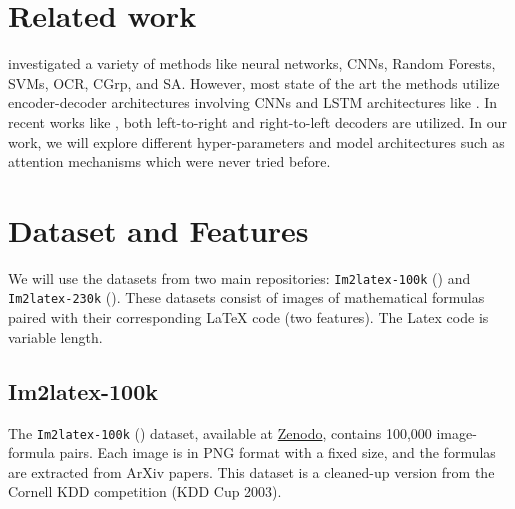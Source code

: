 \documentclass{article}
\begin{document}
\section{Related work}
\cite{schechter2017converting} investigated a variety of methods like neural networks, CNNs, Random Forests, SVMs, OCR, CGrp, and SA. However, most state of the art the methods utilize encoder-decoder architectures involving CNNs and LSTM architectures like \cite{genthial2016image}. In recent works like \cite{bian2022handwritten}, both left-to-right and right-to-left decoders are utilized. In our work, we will explore different hyper-parameters and model architectures such as attention mechanisms which were never tried before. 

\section{Dataset and Features}

We will use the datasets from two main repositories: \texttt{Im2latex-100k} (\cite{kanervisto_2016_56198}) and \texttt{Im2latex-230k} (\cite{gervais2024mathwritingdatasethandwrittenmathematical}). These datasets consist of images of mathematical formulas paired with their corresponding LaTeX code (two features). The Latex code is variable length.

\subsection*{Im2latex-100k}
The \texttt{Im2latex-100k} (\cite{kanervisto_2016_56198}) dataset, available at \href{https://zenodo.org/records/11230382}{Zenodo}, contains 100,000 image-formula pairs. Each image is in PNG format with a fixed size, and the formulas are extracted from ArXiv papers. This dataset is a cleaned-up version from the Cornell KDD competition (KDD Cup 2003).
\end{document}
